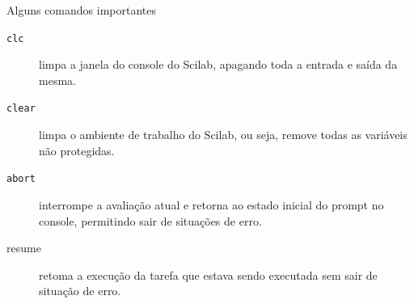\begin{frame}{Alguns comandos importantes}
  \begin{description}
    \item[\texttt{clc}] limpa a janela do console do Scilab, apagando
    toda a entrada e saída da mesma.

    \item[\texttt{clear}] limpa o ambiente de trabalho do Scilab, ou
    seja, remove todas as variáveis não protegidas.

    \item[\texttt{abort}] interrompe a avaliação atual e retorna ao
    estado inicial do prompt no console, permitindo sair de situações de
    erro.

    \item[resume] retoma a execução da tarefa que estava sendo executada
    sem sair de situação de erro.
  \end{description}
\end{frame}

